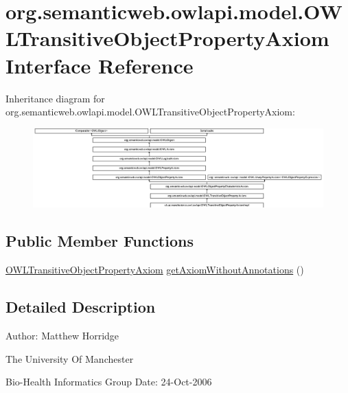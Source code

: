 \hypertarget{interfaceorg_1_1semanticweb_1_1owlapi_1_1model_1_1_o_w_l_transitive_object_property_axiom}{\section{org.\-semanticweb.\-owlapi.\-model.\-O\-W\-L\-Transitive\-Object\-Property\-Axiom Interface Reference}
\label{interfaceorg_1_1semanticweb_1_1owlapi_1_1model_1_1_o_w_l_transitive_object_property_axiom}
}
Inheritance diagram for org.\-semanticweb.\-owlapi.\-model.\-O\-W\-L\-Transitive\-Object\-Property\-Axiom\-:\begin{figure}[H]
\begin{center}
\leavevmode
\includegraphics[height=3.060109cm]{interfaceorg_1_1semanticweb_1_1owlapi_1_1model_1_1_o_w_l_transitive_object_property_axiom}
\end{center}
\end{figure}
\subsection*{Public Member Functions}
\begin{DoxyCompactItemize}
\item 
\hyperlink{interfaceorg_1_1semanticweb_1_1owlapi_1_1model_1_1_o_w_l_transitive_object_property_axiom}{O\-W\-L\-Transitive\-Object\-Property\-Axiom} \hyperlink{interfaceorg_1_1semanticweb_1_1owlapi_1_1model_1_1_o_w_l_transitive_object_property_axiom_a6035b0f2ae5e8a9b861017a7958f61b9}{get\-Axiom\-Without\-Annotations} ()
\end{DoxyCompactItemize}


\subsection{Detailed Description}
Author\-: Matthew Horridge\par
 The University Of Manchester\par
 Bio-\/\-Health Informatics Group Date\-: 24-\/\-Oct-\/2006 

